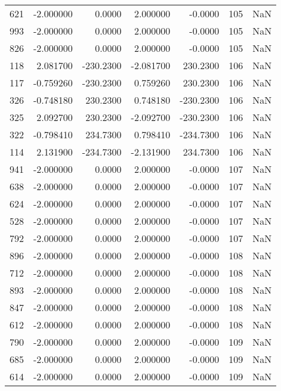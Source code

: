 \begin{tabular}{rrrrrrr}
 621 &   -2.000000 &    0.0000 &    2.000000 &     -0.0000 &         105 & NaN \\
 993 &   -2.000000 &    0.0000 &    2.000000 &     -0.0000 &         105 & NaN \\
 826 &   -2.000000 &    0.0000 &    2.000000 &     -0.0000 &         105 & NaN \\
 118 &    2.081700 & -230.2300 &   -2.081700 &    230.2300 &         106 & NaN \\
 117 &   -0.759260 & -230.2300 &    0.759260 &    230.2300 &         106 & NaN \\
 326 &   -0.748180 &  230.2300 &    0.748180 &   -230.2300 &         106 & NaN \\
 325 &    2.092700 &  230.2300 &   -2.092700 &   -230.2300 &         106 & NaN \\
 322 &   -0.798410 &  234.7300 &    0.798410 &   -234.7300 &         106 & NaN \\
 114 &    2.131900 & -234.7300 &   -2.131900 &    234.7300 &         106 & NaN \\
 941 &   -2.000000 &    0.0000 &    2.000000 &     -0.0000 &         107 & NaN \\
 638 &   -2.000000 &    0.0000 &    2.000000 &     -0.0000 &         107 & NaN \\
 624 &   -2.000000 &    0.0000 &    2.000000 &     -0.0000 &         107 & NaN \\
 528 &   -2.000000 &    0.0000 &    2.000000 &     -0.0000 &         107 & NaN \\
 792 &   -2.000000 &    0.0000 &    2.000000 &     -0.0000 &         107 & NaN \\
 896 &   -2.000000 &    0.0000 &    2.000000 &     -0.0000 &         108 & NaN \\
 712 &   -2.000000 &    0.0000 &    2.000000 &     -0.0000 &         108 & NaN \\
 893 &   -2.000000 &    0.0000 &    2.000000 &     -0.0000 &         108 & NaN \\
 847 &   -2.000000 &    0.0000 &    2.000000 &     -0.0000 &         108 & NaN \\
 612 &   -2.000000 &    0.0000 &    2.000000 &     -0.0000 &         108 & NaN \\
 790 &   -2.000000 &    0.0000 &    2.000000 &     -0.0000 &         109 & NaN \\
 685 &   -2.000000 &    0.0000 &    2.000000 &     -0.0000 &         109 & NaN \\
 614 &   -2.000000 &    0.0000 &    2.000000 &     -0.0000 &         109 & NaN \\

\end{tabular}
